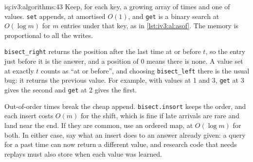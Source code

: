 \begin{solution}{iq:iv3:algorithms:43}
Keep, for each key, a growing array of times and one of values. \texttt{set} appends, at amortised $O(1)$, and \texttt{get} is a binary search at $O(\log m)$ for $m$ entries under that key, as in \cref{lst:iv3:al:asof}. The memory is proportional to all the writes.
\label{lst:iv3:al:asof}

\texttt{bisect\_right} returns the position after the last time at or before $t$, so the entry just before it is the answer, and a position of 0 means there is none. A value set at exactly $t$ counts as ``at or before'', and choosing \texttt{bisect\_left} there is the usual bug: it returns the previous value. For example, with values at 1 and 3, \texttt{get} at 3 gives the second and \texttt{get} at 2 gives the first.

Out-of-order times break the cheap append. \texttt{bisect.insort} keeps the order, and each insert costs $O(m)$ for the shift, which is fine if late arrivals are rare and land near the end. If they are common, use an ordered map, at $O(\log m)$ for both. In either case, say what an insert does to an answer already given: a query for a past time can now return a different value, and research code that needs replays must also store when each value was learned.

\end{solution}

